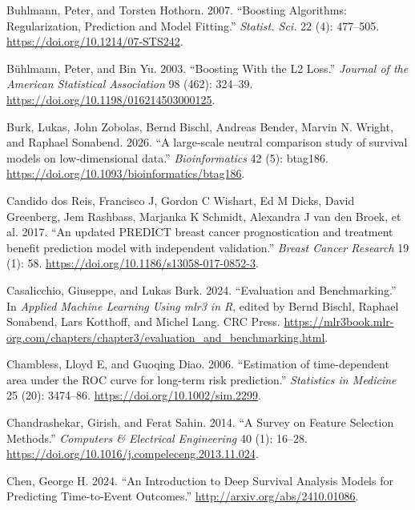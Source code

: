 \documentclass[
  letterpaper,
  krantz2]{style/krantz}
\newlength{\cslhangindent}
\newenvironment{CSLReferences}[2] %
 {\begin{list}{}{%
  \setlength{\itemindent}{0pt}
  \setlength{\leftmargin}{0pt}
  \setlength{\parsep}{0pt}
  \ifodd #1
   \setlength{\leftmargin}{\cslhangindent}
   \setlength{\itemindent}{-1\cslhangindent}
  \fi
  \setlength{\itemsep}{#2\baselineskip}}}
 {\end{list}}
\begin{document}
\begin{CSLReferences}{1}{0}
Buhlmann, Peter, and Torsten Hothorn. 2007. {``{Boosting Algorithms:
Regularization, Prediction and Model Fitting}.''} \emph{Statist. Sci.}
22 (4): 477--505. \url{https://doi.org/10.1214/07-STS242}.

Bühlmann, Peter, and Bin Yu. 2003. {``{Boosting With the L2 Loss}.''}
\emph{Journal of the American Statistical Association} 98 (462):
324--39. \url{https://doi.org/10.1198/016214503000125}.

Burk, Lukas, John Zobolas, Bernd Bischl, Andreas Bender, Marvin N.
Wright, and Raphael Sonabend. 2026. {``{A large-scale neutral comparison
study of survival models on low-dimensional data}.''}
\emph{Bioinformatics} 42 (5): btag186.
\url{https://doi.org/10.1093/bioinformatics/btag186}.

Candido dos Reis, Francisco J, Gordon C Wishart, Ed M Dicks, David
Greenberg, Jem Rashbass, Marjanka K Schmidt, Alexandra J van den Broek,
et al. 2017. {``{An updated PREDICT breast cancer prognostication and
treatment benefit prediction model with independent validation}.''}
\emph{Breast Cancer Research} 19 (1): 58.
\url{https://doi.org/10.1186/s13058-017-0852-3}.

Casalicchio, Giuseppe, and Lukas Burk. 2024. {``Evaluation and
Benchmarking.''} In \emph{Applied Machine Learning Using {m}lr3 in {R}},
edited by Bernd Bischl, Raphael Sonabend, Lars Kotthoff, and Michel
Lang. CRC Press.
\url{https://mlr3book.mlr-org.com/chapters/chapter3/evaluation_and_benchmarking.html}.

Chambless, Lloyd E, and Guoqing Diao. 2006. {``{Estimation of
time-dependent area under the ROC curve for long-term risk
prediction}.''} \emph{Statistics in Medicine} 25 (20): 3474--86.
\url{https://doi.org/10.1002/sim.2299}.

Chandrashekar, Girish, and Ferat Sahin. 2014. {``A Survey on Feature
Selection Methods.''} \emph{Computers \& Electrical Engineering} 40 (1):
16--28. \url{https://doi.org/10.1016/j.compeleceng.2013.11.024}.

Chen, George H. 2024. {``{An Introduction to Deep Survival Analysis
Models for Predicting Time-to-Event Outcomes}.''}
\url{http://arxiv.org/abs/2410.01086}.


\end{CSLReferences}
\end{document}
